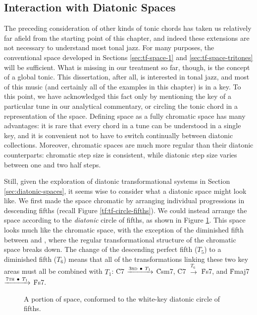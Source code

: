
\subsection{Interaction with Diatonic Spaces}

The preceding consideration of other kinds of tonic chords has taken us
relatively far afield from the starting point of this chapter, and indeed
these extensions are not necessary to understand most tonal jazz. For many
purposes, the conventional space developed in Sections \ref{sec:tf-space-1}
and \ref{sec:tf-space-tritones} will be sufficient. What is missing in our
treatment so far, though, is the concept of a global tonic. This dissertation,
after all, is interested in tonal jazz, and most of this music (and certainly
all of the examples in this chapter) is in a key. To this point, we have
acknowledged this fact only by mentioning the key of a particular tune in our
analytical commentary, or circling the tonic chord in a representation of the
space. Defining \tf space as a fully chromatic space has many advantages: it
is rare that every chord in a tune can be understood in a single key, and it
is convenient not to have to switch continually between diatonic collections.
Moreover, chromatic spaces are much more regular than their diatonic
counterparts: chromatic step size is consistent, while diatonic step size
varies between one and two half steps.

Still, given the exploration of diatonic transformational systems in Section
\ref{sec:diatonic-spaces}, it seems wise to consider what a diatonic \tf space
might look like. We first made the space chromatic by arranging individual
\tfo progressions in descending fifths (recall Figure
\ref{tf:tf-circle-fifths}). We could instead arrange the space according to
the \emph{diatonic} circle of fifths, as shown in Figure
\ref{tfe:tf-diatonic-fifths}. This space looks much like the chromatic space,
with the exception of the diminished fifth between  and , where the
regular transformational structure of the chromatic space breaks down. The
change of the descending perfect fifth ($T_5$) to a diminished fifth ($T_6$)
means that all of the transformations linking these two key areas must all be
combined with $T_1$: \h{C7} $\xrightarrow{3\text{\textsc{rd}}\ \bullet\ T_1}$
\h{Csm7}, \h{C7} $\xrightarrow{T_6\;}$ \h{Fs7}, and \h{Fmaj7}
$\xrightarrow{7\text{\textsc{th}}\ \bullet\ T_1}$ \h{Fs7}.

\begin{figure}[tbp]
  \caption{A portion of \tf space, conformed to the white-key diatonic circle
    of fifths.}
  \label{tfe:tf-diatonic-fifths}
\end{figure}


